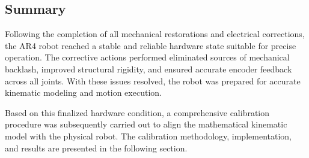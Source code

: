 \subsection{Summary}
Following the completion of all mechanical restorations and electrical corrections, the AR4 robot reached a stable and reliable hardware state suitable for precise operation. The corrective actions performed eliminated sources of mechanical backlash, improved structural rigidity, and ensured accurate encoder feedback across all joints. With these issues resolved, the robot was prepared for accurate kinematic modeling and motion execution.

Based on this finalized hardware condition, a comprehensive calibration procedure was subsequently carried out to align the mathematical kinematic model with the physical robot. The calibration methodology, implementation, and results are presented in the following section.
\clearpage